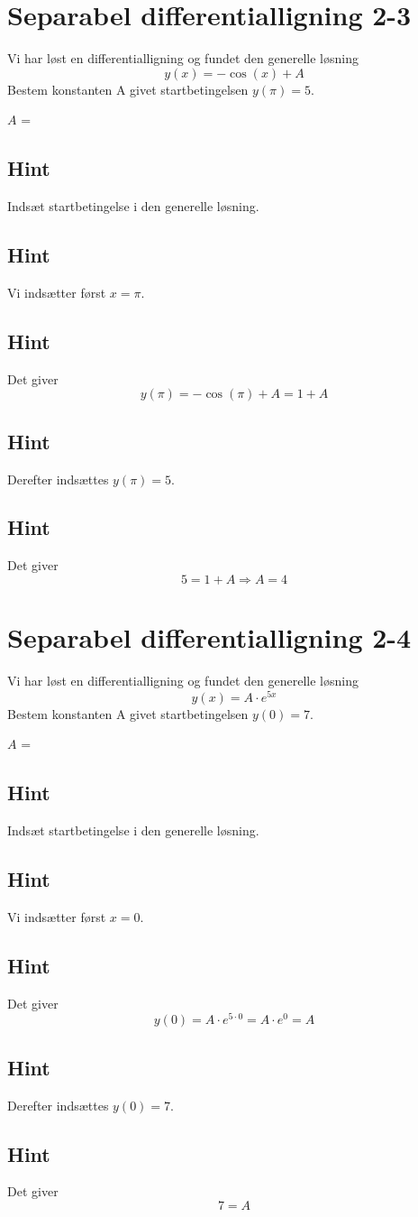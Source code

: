 \documentclass{article}
\newenvironment{exercise}[1]{\newpage\section{#1}}{}
\newcommand{\answerbox}[1]{\fbox{$#1$}}
\newcommand{\hint}{\subsection*{Hint}}
\begin{document}
\begin{exercise}{Separabel differentialligning 2-3}

	Vi har løst en differentialligning og fundet den generelle løsning
	\[
	y(x) = - \cos(x) + A
	\]
	Bestem konstanten A givet startbetingelsen $y(\pi)=5$.
	
	$A$ = \answerbox{4}
	
	\hint
	
	Indsæt startbetingelse i den generelle løsning. 
	
	
	\hint
	
	Vi indsætter først $x=\pi$.
	
	\hint
	
	Det giver
	\[
	y(\pi)= -\cos (\pi) + A = 1 + A
	\]
	
	\hint
	
	Derefter indsættes $y(\pi)=5$.
	
	\hint 
	
	Det giver 
	\[
	5 = 1 + A  \Rightarrow A = 4
	\]
	
\end{exercise}

\newpage


\begin{exercise}{Separabel differentialligning 2-4}

	
	Vi har løst en differentialligning og fundet den generelle løsning
	\[
	y(x) =  A \cdot e^{5x}
	\]
	Bestem konstanten A givet startbetingelsen $y(0)=7$.
	
	$A$ = \answerbox{7}
	
	\hint
	
	Indsæt startbetingelse i den generelle løsning. 
	
	
	\hint
	
	Vi indsætter først $x=0$.
	
	\hint
	
	Det giver
	\[
	y(0)=  A \cdot e^{5 \cdot 0} = A \cdot e^0  = A
	\]
	
	\hint
	
	Derefter indsættes $y(0)=7$.
	
	\hint 
	
	Det giver 
	\[
	7  = A  
	\]
	
\end{exercise}

\newpage
\end{document}
